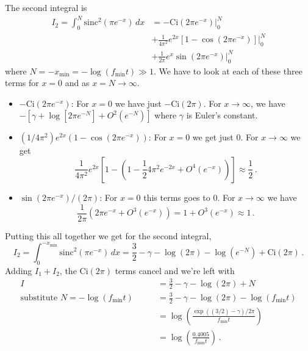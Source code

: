 The second integral is
\begin{align*}
  I_2 = \int_0^{N}\text{sinc}^2 \left(\pi e^{-x}\right)\, dx
  & = -\text{Ci}(2\pi e^{-x})|_0^N \\
  &+ \frac{1}{4\pi^{2}}e^{2x}\left[1-\cos\left(2\pi e^{-x}\right)\right]|_{0}^{N} \\
  &+ \frac{1}{2\pi}e^{x}\sin\left(2\pi e^{-x}\right)|_{0}^{N}
\end{align*}
where $N = -x_\text{min} = -\log(f_\text{min} t) \gg 1$.
We have to look at each of these three terms for $x=0$ and as $x=N\rightarrow\infty$.

\begin{itemize}

  \item $-\text{Ci}(2\pi e^{-x})$: For $x=0$ we have just $-\text{Ci}(2\pi)$.
  For $x \rightarrow \infty$, we have $-\left[\gamma+\log\left[2\pi e^{-N}\right]+O^{2}(e^{-N})\right]$ where $\gamma$ is Euler's constant.

  \item $(1/4\pi^2) e^{2x}\left(1-\cos(2\pi e^{-x})\right)$: For $x=0$ we get just 0.
    For $x \rightarrow \infty$ we get
    \begin{equation*}
      \frac{1}{4 \pi^2} e^{2x} \left[ 1 - \left( 1 - \frac{1}{2} 4 \pi^2 e^{-2x} + O^4 (e^{-x}) \right) \right] \approx \frac{1}{2} \, .
    \end{equation*}

  \item $\sin \left(2 \pi e^{-x}\right) / (2\pi)$: For $x=0$ this terms goes to 0.
    For $x \rightarrow \infty$ we have
    \begin{equation*}
      \frac{1}{2 \pi} \left(2 \pi e^{-x} + O^3(e^{-x}) \right) = 1 + O^3(e^{-x}) \approx 1 \, .
    \end{equation*}
\end{itemize}
Putting this all together we get for the second integral,
\begin{equation}
  I_2 = \int_0^{-x_\text{min}}\text{sinc}^2 \left( \pi e^{-x} \right)\, dx
  = \frac{3}{2} -\gamma -\log \left(2\pi \right) - \log\left( e^{-N} \right) + \text{Ci}\left(2\pi\right) \, .
\end{equation}
Adding $I_1 + I_2$, the $\text{Ci}(2\pi)$ terms cancel and we're left with
\begin{align}
  I
  & = \frac{3}{2}-\gamma - \log\left(2\pi\right) + N \nonumber \\
  \text{substitute } N = - \log\left(f_\text{min}t\right) \qquad
  & = \frac{3}{2} - \gamma - \log\left(2\pi\right) - \log\left( f_\text{min}t \right) \nonumber \\
  & = \log\left(\frac{\exp((3/2) - \gamma) / 2\pi}{f_\text{min} t} \right) \nonumber \\
  & = \log\left(\frac{0.4005}{f_\text{min}t}\right)
  \, .
\end{align}
